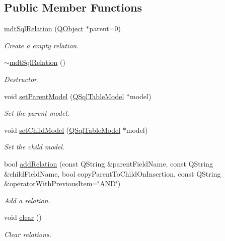 \subsection*{Public Member Functions}
\begin{DoxyCompactItemize}
\item 
\hyperlink{classmdt_sql_relation_a65d9602a4663c8c356938ba9a217704f}{mdt\-Sql\-Relation} (\hyperlink{class_q_object}{Q\-Object} $\ast$parent=0)
\begin{DoxyCompactList}\small\item\em Create a empty relation. \end{DoxyCompactList}\item 
\hyperlink{classmdt_sql_relation_a22c7de1daa71abbde33199a08541310b}{$\sim$mdt\-Sql\-Relation} ()
\begin{DoxyCompactList}\small\item\em Destructor. \end{DoxyCompactList}\item 
void \hyperlink{classmdt_sql_relation_a5ac3a82c5d3e33b5e40b86acfe7e2a03}{set\-Parent\-Model} (\hyperlink{class_q_sql_table_model}{Q\-Sql\-Table\-Model} $\ast$model)
\begin{DoxyCompactList}\small\item\em Set the parent model. \end{DoxyCompactList}\item 
void \hyperlink{classmdt_sql_relation_ad74021dcf86c528044bf67220ed36833}{set\-Child\-Model} (\hyperlink{class_q_sql_table_model}{Q\-Sql\-Table\-Model} $\ast$model)
\begin{DoxyCompactList}\small\item\em Set the child model. \end{DoxyCompactList}\item 
bool \hyperlink{classmdt_sql_relation_a5980d1df4582971666ffe1c1d7639799}{add\-Relation} (const Q\-String \&parent\-Field\-Name, const Q\-String \&child\-Field\-Name, bool copy\-Parent\-To\-Child\-On\-Insertion, const Q\-String \&operator\-With\-Previous\-Item=\char`\"{}A\-N\-D\char`\"{})
\begin{DoxyCompactList}\small\item\em Add a relation. \end{DoxyCompactList}\item 
void \hyperlink{classmdt_sql_relation_a01469fb1baf7327ca6ddbcd1595e0d7c}{clear} ()
\begin{DoxyCompactList}\small\item\em Clear relations. \end{DoxyCompactList}\end{DoxyCompactItemize}


